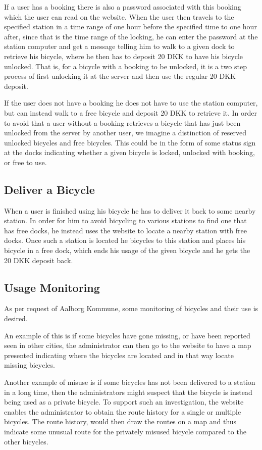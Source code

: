 If a user has a booking there is also a password associated with this booking which the user can read on the website.
When the user then travels to the specified station in a time range of one hour before the specified time to one hour after, since that is the time range of the locking, he can enter the password at the station computer and get a message telling him to walk to a given dock to retrieve his bicycle, where he then has to deposit 20 DKK to have his bicycle unlocked.
That is, for a bicycle with a booking to be unlocked, it is a two step process of first unlocking it at the server and then use the regular 20 DKK deposit.

If the user does not have a booking he does not have to use the station computer, but can instead walk to a free bicycle and deposit 20 DKK to retrieve it.
In order to avoid that a user without a booking retrieves a bicycle that has just been unlocked from the server by another user, we imagine a distinction of reserved unlocked bicycles and free bicycles.
This could be in the form of some status sign at the docks indicating whether a given bicycle is locked, unlocked with booking, or free to use.

\subsection{Deliver a Bicycle}
When a user is finished using his bicycle he has to deliver it back to some nearby station.
In order for him to avoid bicycling to various stations to find one that has free docks, he instead uses the website to locate a nearby station with free docks.
Once such a station is located he bicycles to this station and places his bicycle in a free dock, which ends his usage of the given bicycle and he gets the 20 DKK deposit back.

\subsection{Usage Monitoring}
As per request of Aalborg Kommune, some monitoring of bicycles and their use is desired.

An example of this is if some bicycles have gone missing, or have been reported seen in other cities, the administrator can then go to the website to have a map presented indicating where the bicycles are located and in that way locate missing bicycles.

Another example of misuse is if some bicycles has not been delivered to a station in a long time, then the administrators might suspect that the bicycle is instead being used as a private bicycle. To support such an investigation, the website enables the administrator to obtain the route history for a single or multiple bicycles.
The route history, would then draw the routes on a map and thus indicate some unusual route for the privately misused bicycle compared to the other bicycles.

